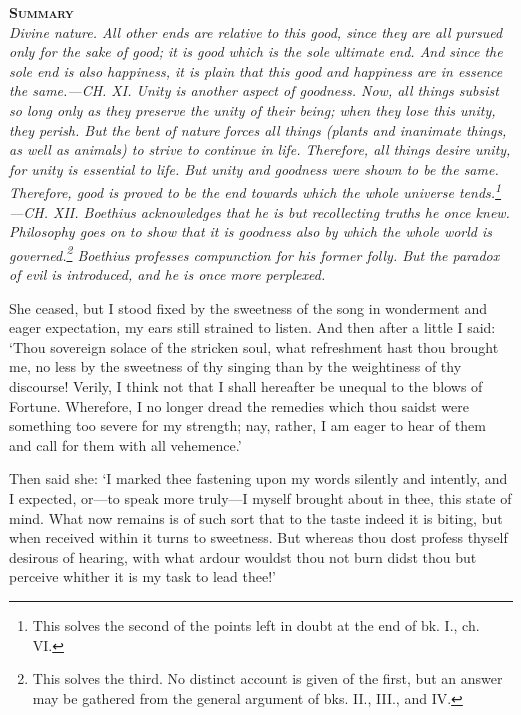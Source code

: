 \documentclass[11pt]{book}
\newenvironment{abstract}%
  {\noindent \textbf{\scshape Summary} \\ \rightskip1in\itshape\small}%
  {\bigskip}
\begin{document}
\begin{abstract}
     Divine nature. All other ends are relative to this good, since they
     are all pursued only for the sake of good; it is \emph{good} which is
     the sole ultimate end. And since the sole end is also happiness, it
     is plain that this good and happiness are in essence the same.---CH.
     XI. Unity is another aspect of goodness. Now, all things subsist so
     long only as they preserve the unity of their being; when they lose
     this unity, they perish. But the bent of nature forces all things
     (plants and inanimate things, as well as animals) to strive to
     continue in life. Therefore, all things desire unity, for unity is
     essential to life. But unity and goodness were shown to be the
     same. Therefore, good is proved to be the end towards which the
     whole universe tends.\footnote{This solves the second of the points left in doubt at the end of bk. I., ch. VI.}---CH. XII. Boethius acknowledges that he is
     but recollecting truths he once knew. Philosophy goes on to show
     that it is goodness also by which the whole world is governed.\footnote{This solves the third. No distinct account is given of the first, but an answer may be gathered from the general argument of bks. II., III., and IV.}
     Boethius professes compunction for his former folly. But the
     paradox of evil is introduced, and he is once more perplexed.
\end{abstract}

She ceased, but I stood fixed by the sweetness of the song in wonderment
and eager expectation, my ears still strained to listen. And then after
a little I said: `Thou sovereign solace of the stricken soul, what
refreshment hast thou brought me, no less by the sweetness of thy
singing than by the weightiness of thy discourse! Verily, I think not
that I shall hereafter be unequal to the blows of Fortune. Wherefore, I
no longer dread the remedies which thou saidst were something too severe
for my \linebreak strength; nay, rather, I am eager to hear of them and call for
them with all vehemence.'

Then said she: `I marked thee fastening upon my words silently and
intently, and I expected, or---to speak more truly---I myself brought
about in thee, this state of mind. What now remains is of such sort that
to the taste indeed it is biting, but when received within it turns to
sweetness. But whereas thou dost profess thyself desirous of hearing,
with what ardour wouldst thou not burn didst thou but perceive whither
it is my task to lead thee!'
\end{document}
